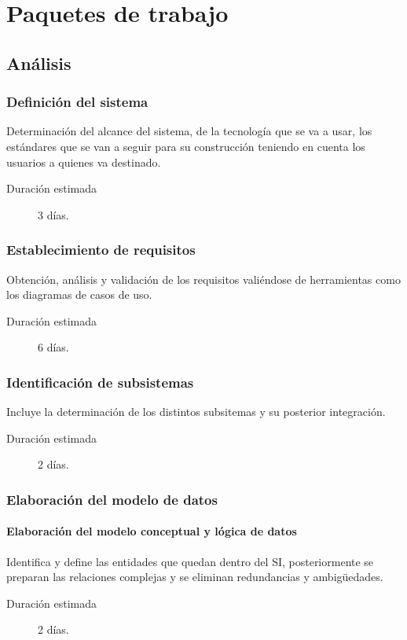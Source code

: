 \documentclass[11pt,a4paper,spanish,twoside]{report}
\begin{document}
\chapter{Paquetes de trabajo}
\section{Análisis}
\subsection{Definición del sistema}
Determinación del alcance del sistema, de la tecnología que se va a usar, los
estándares que se van a seguir para su  construcción teniendo en cuenta los
usuarios a quienes va destinado.
\begin{description}
\item[Duración estimada] 3 días.
\end{description}

\subsection{Establecimiento de requisitos}
Obtención, análisis y validación de los requisitos valiéndose de herramientas
como los diagramas de casos de uso.
\begin{description}
\item[Duración estimada] 6 días.
\end{description}

\subsection{Identificación de subsistemas}
Incluye la determinación de los distintos subsitemas y su posterior
integración.
\begin{description}
\item[Duración estimada] 2 días.
\end{description}

\subsection{Elaboración del modelo de datos}
\subsubsection{Elaboración del modelo conceptual y lógica de datos}
Identifica y define las entidades que quedan dentro del SI, posteriormente se
preparan las relaciones complejas y se eliminan redundancias y ambigüedades. 
\begin{description}
\item[Duración estimada] 2 días.
\end{description}
\end{document}
